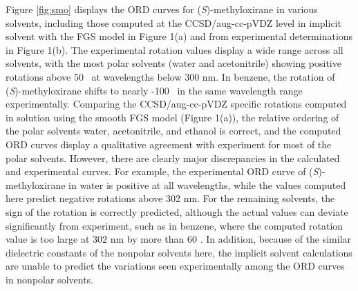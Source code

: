Figure \ref{fig:smo} displays the ORD curves for (\emph{S})-methyloxirane in
various solvents, including those computed at the CCSD/aug-cc-pVDZ level
in implicit solvent with the FGS model in Figure 1(a) and from experimental
determinations in Figure 1(b).
\cite{Wilson:05} The experimental rotation values display a wide
range
across all solvents, with the most polar solvents (water and acetonitrile)
showing positive rotations above 50 \rotunits\ at wavelengths
below 300 nm. In benzene,
the rotation of (\emph{S})-methyloxirane shifts to nearly -100 \rotunits\
in the same wavelength range experimentally. Comparing the CCSD/aug-cc-pVDZ
specific rotations computed in solution using the smooth FGS model (Figure
1(a)),
the relative ordering of the polar solvents water, acetonitrile, and ethanol
is correct, and the computed ORD curves display a qualitative agreement
with experiment for most of the polar solvents.
However, there are clearly major discrepancies in the calculated
and experimental curves. For example, the experimental ORD curve of (\emph{S})-methyloxirane
in water is positive at all wavelengths, while the values computed here
predict negative rotations above 302 nm. For the remaining solvents,
the sign of the rotation is correctly predicted, although the actual
values can deviate significantly from experiment, such as in benzene,
where the computed rotation value is too large at 302 nm by more than 60
\rotunits. In addition, because of the similar dielectric constants
of the nonpolar solvents here, the implicit solvent calculations are unable
to predict the variations seen experimentally among the ORD curves in nonpolar solvents.

